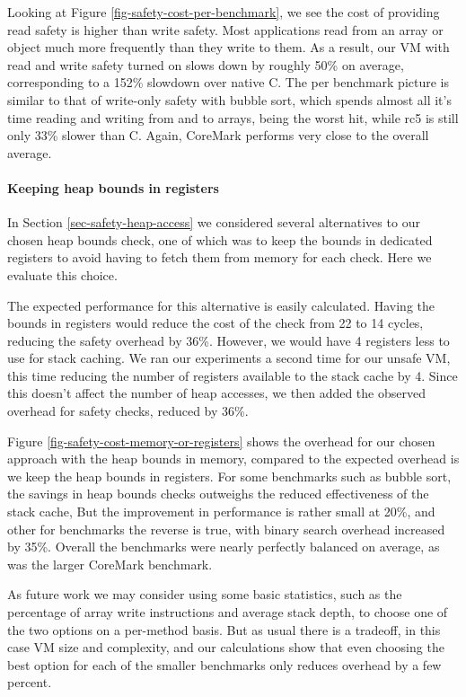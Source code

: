 Looking at Figure \ref{fig-safety-cost-per-benchmark}, we see the cost of providing read safety is higher than write safety. Most applications read from an array or object much more frequently than they write to them. As a result, our VM with read and write safety turned on slows down by roughly 50\% on average, corresponding to a 152\% slowdown over native C. The per benchmark picture is similar to that of write-only safety with bubble sort, which spends almost all it's time reading and writing from and to arrays, being the worst hit, while rc5 is still only 33\% slower than C. Again, CoreMark performs very close to the overall average.

\paragraph{Keeping heap bounds in registers}
In Section \ref{sec-safety-heap-access} we considered several alternatives to our chosen heap bounds check, one of which was to keep the bounds in dedicated registers to avoid having to fetch them from memory for each check. Here we evaluate this choice.

The expected performance for this alternative is easily calculated. Having the bounds in registers would reduce the cost of the check from 22 to 14 cycles, reducing the safety overhead by 36\%. However, we would have 4 registers less to use for stack caching. We ran our experiments a second time for our unsafe VM, this time reducing the number of registers available to the stack cache by 4. Since this doesn't affect the number of heap accesses, we then added the observed overhead for safety checks, reduced by 36\%.

Figure \ref{fig-safety-cost-memory-or-registers} shows the overhead for our chosen approach with the heap bounds in memory, compared to the expected overhead is we keep the heap bounds in registers. For some benchmarks such as bubble sort, the savings in heap bounds checks outweighs the reduced effectiveness of the stack cache, But the improvement in performance is rather small at 20\%, and other for benchmarks the reverse is true, with binary search overhead increased by 35\%. Overall the benchmarks were nearly perfectly balanced on average, as was the larger CoreMark benchmark.

As future work we may consider using some basic statistics, such as the percentage of array write instructions and average stack depth, to choose one of the two options on a per-method basis. But as usual there is a tradeoff, in this case VM size and complexity, and our calculations show that even choosing the best option for each of the smaller benchmarks only reduces overhead by a few percent.


